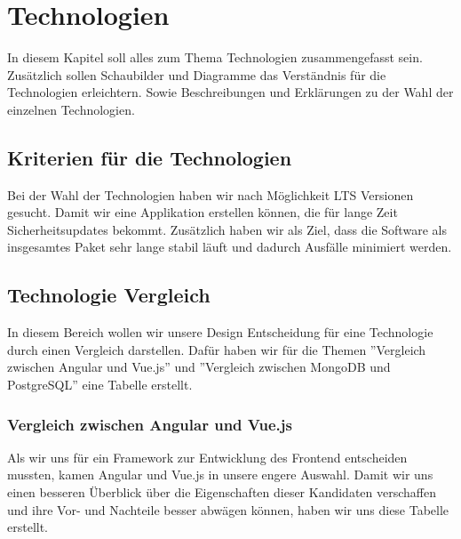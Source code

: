 \section{Technologien}
In diesem Kapitel soll alles zum Thema Technologien zusammengefasst sein.
Zusätzlich sollen Schaubilder und Diagramme das Verständnis für die Technologien erleichtern.
Sowie Beschreibungen und Erklärungen zu der Wahl der einzelnen Technologien.

\subsection{Kriterien für die Technologien}
Bei der Wahl der Technologien haben wir nach Möglichkeit LTS Versionen gesucht.
Damit wir eine Applikation erstellen können, die für lange Zeit Sicherheitsupdates
bekommt. Zusätzlich haben wir als Ziel, dass die Software als insgesamtes Paket sehr lange
stabil läuft und dadurch Ausfälle minimiert werden.

\subsection{Technologie Vergleich}
In diesem Bereich wollen wir unsere Design Entscheidung für eine Technologie durch einen Vergleich darstellen.
Dafür haben wir für die Themen ''Vergleich zwischen Angular und Vue.js'' und ''Vergleich zwischen MongoDB und PostgreSQL'' eine Tabelle erstellt.

\newpage
\subsubsection{Vergleich zwischen Angular und Vue.js}

Als wir uns für ein Framework zur Entwicklung des Frontend entscheiden mussten, kamen Angular und Vue.js in unsere engere Auswahl.
Damit wir uns einen besseren Überblick über die Eigenschaften dieser Kandidaten verschaffen und ihre Vor- und Nachteile besser abwägen können, 
haben wir uns diese Tabelle erstellt.

